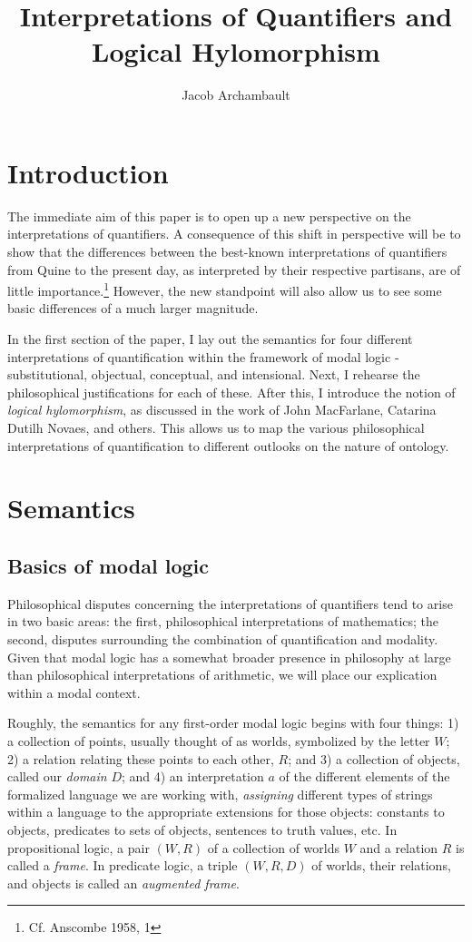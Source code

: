 \documentclass[]{article}
\title{Interpretations of Quantifiers and Logical Hylomorphism}
\author{Jacob Archambault}
\begin{document}
\maketitle

\begin{abstract}

\end{abstract}

\section{Introduction}
The immediate aim of this paper is to open up a new perspective on the interpretations of quantifiers. A consequence of this shift in perspective will be to show that the differences between the best-known interpretations of quantifiers from Quine to the present day, as interpreted by their respective partisans, are of little importance.\footnote{Cf. Anscombe 1958, 1} However, the new standpoint will also allow us to see some basic differences of a much larger magnitude.

In the first section of the paper, I lay out the semantics for four different interpretations of quantification within the framework of modal logic - substitutional, objectual, conceptual, and intensional. Next, I rehearse the philosophical justifications for each of these. After this, I introduce the notion of \textit{logical hylomorphism}, as discussed in the work of John MacFarlane, Catarina Dutilh Novaes, and others. This allows us to map the various philosophical interpretations of quantification to different outlooks on the nature of ontology.
\section{Semantics}
\subsection{Basics of modal logic}
Philosophical disputes concerning the interpretations of quantifiers tend to arise in two basic areas: the first, philosophical interpretations of mathematics; the second, disputes surrounding the combination of quantification and modality. Given that modal logic has a somewhat broader presence in philosophy at large than philosophical interpretations of arithmetic, we will place our explication within a modal context.

Roughly, the semantics for any first-order modal logic begins with four things: 1) a collection of points, usually thought of as worlds, symbolized by the letter $W$; 2) a relation relating these points to each other, $R$; and 3) a collection of objects, called our \textit{domain} $D$; and 4) an interpretation $a$ of the different elements of the formalized language we are working with, \textit{assigning} different types of strings within a language to the appropriate extensions for those objects: constants to objects, predicates to sets of objects, sentences to truth values, etc. In propositional logic, a pair $(W, R)$ of a collection of worlds $W$ and a relation $R$ is called a \textit{frame}. In predicate logic, a triple $(W, R, D)$ of worlds, their relations, and objects is called an \textit{augmented frame}.
\end{document}
